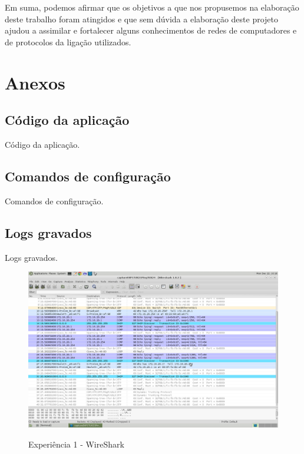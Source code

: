 \documentclass[a4paper]{article}
\begin{document}
Em suma, podemos afirmar que os objetivos a que nos propusemos na elaboração deste trabalho foram atingidos e que sem dúvida a elaboração deste projeto ajudou a assimilar e fortalecer alguns conhecimentos de redes de computadores e de protocolos da ligação utilizados.

\clearpage
{}
\renewcommand\refname{Referências}




\newpage
\appendix
\section{Anexos}

\subsection{Código da aplicação}
Código da aplicação.

\subsection{Comandos de configuração}
Comandos de configuração.

\subsection{Logs gravados}
Logs gravados.

\begin{figure}[h!]
\caption{Experiência 1 - WireShark}
\includegraphics[scale=0.25]{res/image2.png}
\label{fig:teste}
\end{figure}
\end{document}
